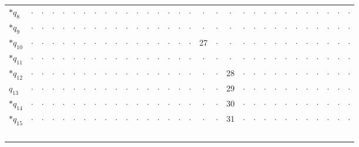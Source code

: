 \begin{longtable}{@{}l|*{30}{c}@{}}
$\ast$$q_{8}$ & $\cdot$ & $\cdot$ & $\cdot$ & $\cdot$ & $\cdot$ & $\cdot$ & $\cdot$ & $\cdot$ & $\cdot$ & $\cdot$ & $\cdot$ & $\cdot$ & $\cdot$ & $\cdot$ & $\cdot$ & $\cdot$ & $\cdot$ & $\cdot$ & $\cdot$ & $\cdot$ & $\cdot$ & $\cdot$ & $\cdot$ & $\cdot$ & $\cdot$ & $\cdot$ & $\cdot$ & $\cdot$ & $\cdot$ & $\cdot$ \\
$\ast$$q_{9}$ & $\cdot$ & $\cdot$ & $\cdot$ & $\cdot$ & $\cdot$ & $\cdot$ & $\cdot$ & $\cdot$ & $\cdot$ & $\cdot$ & $\cdot$ & $\cdot$ & $\cdot$ & $\cdot$ & $\cdot$ & $\cdot$ & $\cdot$ & $\cdot$ & $\cdot$ & $\cdot$ & $\cdot$ & $\cdot$ & $\cdot$ & $\cdot$ & $\cdot$ & $\cdot$ & $\cdot$ & $\cdot$ & $\cdot$ & $\cdot$ \\
$\ast$$q_{10}$ & $\cdot$ & $\cdot$ & $\cdot$ & $\cdot$ & $\cdot$ & $\cdot$ & $\cdot$ & $\cdot$ & $\cdot$ & $\cdot$ & $\cdot$ & $\cdot$ & $\cdot$ & $\cdot$ & $\cdot$ & $\cdot$ & 27 & $\cdot$ & $\cdot$ & $\cdot$ & $\cdot$ & $\cdot$ & $\cdot$ & $\cdot$ & $\cdot$ & $\cdot$ & $\cdot$ & $\cdot$ & $\cdot$ & $\cdot$ \\
$\ast$$q_{11}$ & $\cdot$ & $\cdot$ & $\cdot$ & $\cdot$ & $\cdot$ & $\cdot$ & $\cdot$ & $\cdot$ & $\cdot$ & $\cdot$ & $\cdot$ & $\cdot$ & $\cdot$ & $\cdot$ & $\cdot$ & $\cdot$ & $\cdot$ & $\cdot$ & $\cdot$ & $\cdot$ & $\cdot$ & $\cdot$ & $\cdot$ & $\cdot$ & $\cdot$ & $\cdot$ & $\cdot$ & $\cdot$ & $\cdot$ & $\cdot$ \\
$\ast$$q_{12}$ & $\cdot$ & $\cdot$ & $\cdot$ & $\cdot$ & $\cdot$ & $\cdot$ & $\cdot$ & $\cdot$ & $\cdot$ & $\cdot$ & $\cdot$ & $\cdot$ & $\cdot$ & $\cdot$ & $\cdot$ & $\cdot$ & $\cdot$ & $\cdot$ & 28 & $\cdot$ & $\cdot$ & $\cdot$ & $\cdot$ & $\cdot$ & $\cdot$ & $\cdot$ & $\cdot$ & $\cdot$ & $\cdot$ & $\cdot$ \\
$q_{13}$ & $\cdot$ & $\cdot$ & $\cdot$ & $\cdot$ & $\cdot$ & $\cdot$ & $\cdot$ & $\cdot$ & $\cdot$ & $\cdot$ & $\cdot$ & $\cdot$ & $\cdot$ & $\cdot$ & $\cdot$ & $\cdot$ & $\cdot$ & $\cdot$ & 29 & $\cdot$ & $\cdot$ & $\cdot$ & $\cdot$ & $\cdot$ & $\cdot$ & $\cdot$ & $\cdot$ & $\cdot$ & $\cdot$ & $\cdot$ \\
$\ast$$q_{14}$ & $\cdot$ & $\cdot$ & $\cdot$ & $\cdot$ & $\cdot$ & $\cdot$ & $\cdot$ & $\cdot$ & $\cdot$ & $\cdot$ & $\cdot$ & $\cdot$ & $\cdot$ & $\cdot$ & $\cdot$ & $\cdot$ & $\cdot$ & $\cdot$ & 30 & $\cdot$ & $\cdot$ & $\cdot$ & $\cdot$ & $\cdot$ & $\cdot$ & $\cdot$ & $\cdot$ & $\cdot$ & $\cdot$ & $\cdot$ \\
$\ast$$q_{15}$ & $\cdot$ & $\cdot$ & $\cdot$ & $\cdot$ & $\cdot$ & $\cdot$ & $\cdot$ & $\cdot$ & $\cdot$ & $\cdot$ & $\cdot$ & $\cdot$ & $\cdot$ & $\cdot$ & $\cdot$ & $\cdot$ & $\cdot$ & $\cdot$ & 31 & $\cdot$ & $\cdot$ & $\cdot$ & $\cdot$ & $\cdot$ & $\cdot$ & $\cdot$ & $\cdot$ & $\cdot$ & $\cdot$ & $\cdot$ \\
$$
\end{longtable}

